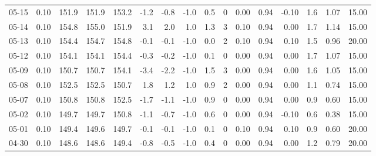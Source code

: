 \begin{threeparttable}
{\begin{tabular}{lrrrrrrrrrrrrrrr}
  05-15 &     0.10 & 151.9 & 151.9 & 153.2 &       -1.2 &           -0.8 &                     -1.0 &                 0.5 &              0 &       0.00 &      0.94 &          -0.10 &              1.6 &            1.07 &                  15.00 \\
  05-14 &     0.10 & 154.8 & 155.0 & 151.9 &        3.1 &            2.0 &                      1.0 &                 1.3 &              3 &       0.10 &      0.94 &           0.00 &              1.7 &            1.14 &                  15.00 \\
  05-13 &     0.10 & 154.4 & 154.7 & 154.8 &       -0.1 &           -0.1 &                     -1.0 &                 0.0 &              2 &       0.10 &      0.94 &           0.10 &              1.5 &            0.96 &                  20.00 \\
  05-12 &     0.10 & 154.1 & 154.1 & 154.4 &       -0.3 &           -0.2 &                     -1.0 &                 0.1 &              0 &       0.00 &      0.94 &           0.00 &              1.7 &            1.07 &                  15.00 \\
  05-09 &     0.10 & 150.7 & 150.7 & 154.1 &       -3.4 &           -2.2 &                     -1.0 &                 1.5 &              3 &       0.00 &      0.94 &           0.00 &              1.6 &            1.05 &                  15.00 \\
  05-08 &     0.10 & 152.5 & 152.5 & 150.7 &        1.8 &            1.2 &                      1.0 &                 0.9 &              2 &       0.00 &      0.94 &           0.00 &              1.1 &            0.74 &                  15.00 \\
  05-07 &     0.10 & 150.8 & 150.8 & 152.5 &       -1.7 &           -1.1 &                     -1.0 &                 0.9 &              0 &       0.00 &      0.94 &           0.00 &              0.9 &            0.60 &                  15.00 \\
  05-02 &     0.10 & 149.7 & 149.7 & 150.8 &       -1.1 &           -0.7 &                     -1.0 &                 0.6 &              0 &       0.00 &      0.94 &          -0.10 &              0.6 &            0.38 &                  15.00 \\
  05-01 &     0.10 & 149.4 & 149.6 & 149.7 &       -0.1 &           -0.1 &                     -1.0 &                 0.1 &              0 &       0.10 &      0.94 &           0.10 &              0.9 &            0.60 &                  20.00 \\
  04-30 &     0.10 & 148.6 & 148.6 & 149.4 &       -0.8 &           -0.5 &                     -1.0 &                 0.4 &              0 &       0.00 &      0.94 &           0.00 &              1.2 &            0.79 &                  20.00 \\

\end{tabular}}
\end{threeparttable}
